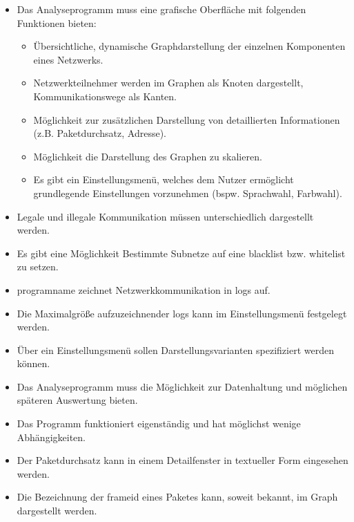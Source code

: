 \begin{itemize}
\item Das Analyseprogramm muss eine grafische Oberfläche mit folgenden Funktionen bieten:

	\begin{itemize}
    \item Übersichtliche, dynamische Graphdarstellung der einzelnen Komponenten eines Netzwerks.
    
    \item Netzwerkteilnehmer werden im Graphen als Knoten dargestellt, Kommunikationswege als Kanten.

    \item Möglichkeit zur zusätzlichen Darstellung von detaillierten Informationen (z.B. Paketdurchsatz, Adresse).

    \item Möglichkeit die Darstellung des Graphen zu skalieren.

    \item Es gibt ein Einstellungsmenü, welches dem Nutzer ermöglicht grundlegende Einstellungen vorzunehmen (bspw. Sprachwahl, Farbwahl).
    \end{itemize}

\item Legale und illegale Kommunikation müssen unterschiedlich dargestellt werden.

\item Es gibt eine Möglichkeit Bestimmte Subnetze auf eine \gls{blacklist} bzw. \gls{whitelist} zu setzen.

\item \gls{programname} zeichnet Netzwerkkommunikation in \glspl{log} auf.

\item Die Maximalgröße aufzuzeichnender \glspl{log} kann im Einstellungsmenü festgelegt werden.

\item Über ein Einstellungsmenü sollen Darstellungsvarianten spezifiziert werden können.

\item Das Analyseprogramm muss die Möglichkeit zur Datenhaltung und möglichen späteren Auswertung bieten.

\item Das Programm funktioniert eigenständig und hat möglichst wenige Abhängigkeiten.

\item Der Paketdurchsatz kann in einem Detailfenster in textueller Form eingesehen werden.

\item Die Bezeichnung der \gls{frameid} eines Paketes kann, soweit bekannt, im Graph dargestellt werden.

\end{itemize}

